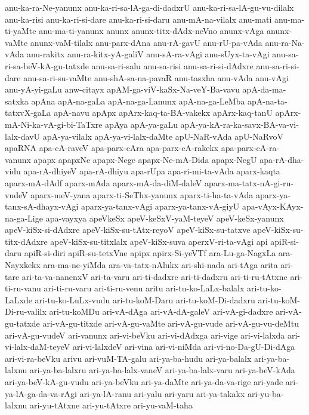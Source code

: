 {anu-ka-ra-Ne-yanunx
anu-ka-ri-sa-lA-ga-di-dadxrU
anu-ka-ri-sa-lA-gu-vu-dilalx
anu-ka-risi
anu-ka-ri-si-dare
anu-ka-ri-si-daru
anu-mA-na-vilalx
anu-mati
anu-ma-ti-yaMte
anu-ma-ti-yanunx
anunx
anunx-titx-dAdx-neVno
anunx-vAga
anunx-vaMte
anunx-vaM-tilalx
anu-parx-dAna
anu-rA-gavU
anu-rU-pa-vAda
anu-ra-Na-vAda
anu-rakitx
anu-ra-kitx-yA-galiV
anu-sA-ra-vAgi
anu-sUyx-ta-vAgi
anu-sa-ri-sa-beV-kA-gu-tatxde
anu-sa-ri-salu
anu-sa-risi
anu-sa-ri-si-dAdxre
anu-sa-ri-si-dare
anu-sa-ri-su-vaMte
anu-shA-sa-na-pavaR
anu-tasxha
anu-vAda
anu-vAgi
anu-yA-yi-gaLu
anw-citayx
apAM-ga-viV-kaSx-Na-veY-Ba-vavu
apA-da-ma-satxka
apAna
apA-na-gaLa
apA-na-ga-Lanunx
apA-na-ga-LeMba
apA-na-ta-tatxvX-gaLa
apA-navu
apApx
apArx-kaq-ta-BA-vakekx
apArx-kaq-tanU
apArx-mA-Ni-ka-vA-gi-bi-TaTxre
apAya
apA-ya-gaLu
apA-ya-kA-ra-ka-savx-BA-va-vi-lalx-davU
apA-ya-vilalx
apA-ya-vi-lalx-daMte
apU-NaR-vAda
apU-NaRvoV
apaRNA
apa-cA-raveV
apa-parx-cAra
apa-parx-cA-rakekx
apa-parx-cA-ra-vanunx
apapx
apapxNe
apapx-Nege
apapx-Ne-mA-Dida
apapx-‌NegU
apa-rA-dha-vidu
apa-rA-dhiyeV
apa-rA-dhiyu
apa-rUpa
apa-ri-mi-ta-vAda
aparx-kaqta
aparx-mA-dAdf
aparx-mAda
aparx-mA-da-diM-daleV
aparx-ma-tatx-nA-gi-ru-vudeV
aparx-meV-yana
aparx-ti-SeThx-yanunx
aparx-ti-ha-ta-vAda
aparx-ya-tanx-sA-dhayx-vAgi
aparx-ya-tanx-vAgi
aparx-ya-tanx-vA-giyU
apa-vAyx-KAyx-na-ga-Lige
apa-vayxya
apeVkeSx
apeV-keSxV-yaM-teyeV
apeV-keSx-yanunx
apeV-kiSx-si-dAdxre
apeV-kiSx-su-tAtx-reyoV
apeV-kiSx-su-tatxve
apeV-kiSx-su-titx-dAdxre
apeV-kiSx-su-titxlalx
apeV-kiSx-suva
aperxV-ri-ta-vAgi
api
apiR-si-daru
apiR-si-diri
apiR-su-tetxVne
apipx
apirx-Si-yeVTf
ara-Lu-ga-NagxLa
ara-Nayxkekx
ara-ma-ne-yiMda
ara-va-tatx-nAlukx
ari-shi-nada
ari-tAga
arita
ari-tare
ari-ta-va-nanenxV
ari-ta-varu
ari-ti-dadxre
ari-ti-dadxru
ari-ti-ru-tAtxne
ari-ti-ru-vanu
ari-ti-ru-varu
ari-ti-ru-venu
aritu
ari-tu-ko-LaLx-balalx
ari-tu-ko-LaLxde
ari-tu-ko-LuLx-vudu
ari-tu-koM-Daru
ari-tu-koM-Di-dadxru
ari-tu-koM-Di-ru-valilx
ari-tu-koMDu
ari-vA-dAga
ari-vA-dA-galeV
ari-vA-gi-dadxre
ari-vA-gu-tatxde
ari-vA-gu-titxde
ari-vA-gu-vaMte
ari-vA-gu-vude
ari-vA-gu-vu-deMtu
ari-vA-gu-vudeV
ari-vanunx
ari-vi-beVku
ari-vi-dAdxga
ari-vige
ari-vi-lalxda
ari-vi-lalx-daM-teyeV
ari-vi-lalxdeV
ari-vina
ari-vi-niMda
ari-vi-no-Da-gU-Di-dAga
ari-vi-ra-beVku
arivu
ari-vuM-TA-galu
ari-ya-ba-hudu
ari-ya-balalx
ari-ya-ba-lalxnu
ari-ya-ba-lalxru
ari-ya-ba-lalx-vaneV
ari-ya-ba-lalx-varu
ari-ya-beV-kAda
ari-ya-beV-kA-gu-vudu
ari-ya-beVku
ari-ya-daMte
ari-ya-da-va-rige
ari-yade
ari-ya-lA-ga-da-va-rAgi
ari-ya-lA-ranu
ari-yalu
ari-yaru
ari-ya-takakx
ari-yu-ba-lalxnu
ari-yu-tAtxne
ari-yu-tAtxre
ari-yu-vaM-taha
}
